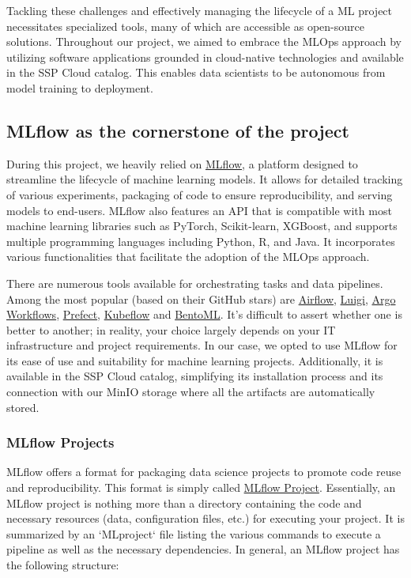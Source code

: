 Tackling these challenges and effectively managing the lifecycle of a ML project necessitates specialized tools, many of which are accessible as open-source solutions. Throughout our project, we aimed to embrace the MLOps approach by utilizing software applications grounded in cloud-native technologies and available in the SSP Cloud catalog. This enables data scientists to be autonomous from model training to deployment.

\subsection{MLflow as the cornerstone of the project}

During this project, we heavily relied on \href{https://github.com/MLflow/MLflow}{MLflow}, a platform designed to streamline the lifecycle of machine learning models. It allows for detailed tracking of various experiments, packaging of code to ensure reproducibility, and serving models to end-users. MLflow also features an API that is compatible with most machine learning libraries such as PyTorch, Scikit-learn, XGBoost, and supports multiple programming languages including Python, R, and Java. It incorporates various functionalities that facilitate the adoption of the MLOps approach.

There are numerous tools available for orchestrating tasks and data pipelines. Among the most popular (based on their GitHub stars) are \href{https://github.com/apache/airflow}{Airflow}, \href{https://github.com/spotify/luigi}{Luigi}, \href{https://github.com/argoproj/argo-workflows}{Argo Workflows}, \href{https://github.com/PrefectHQ/prefect}{Prefect}, \href{https://github.com/kubeflow/kubeflow}{Kubeflow} and \href{https://github.com/bentoml/BentoML}{BentoML}. It's difficult to assert whether one is better to another; in reality, your choice largely depends on your IT infrastructure and project requirements. In our case, we opted to use MLflow for its ease of use and suitability for machine learning projects. Additionally, it is available in the SSP Cloud catalog, simplifying its installation process and its connection with our MinIO storage where all the artifacts are automatically stored.

\subsubsection{MLflow Projects}

MLflow offers a format for packaging data science projects to promote code reuse and reproducibility. This format is simply called \href{https://MLflow.org/docs/latest/projects.html}{MLflow Project}. Essentially, an MLflow project is nothing more than a directory containing the code and necessary resources (data, configuration files, etc.) for executing your project. It is summarized by an `MLproject` file listing the various commands to execute a pipeline as well as the necessary dependencies. In general, an MLflow project has the following structure:

